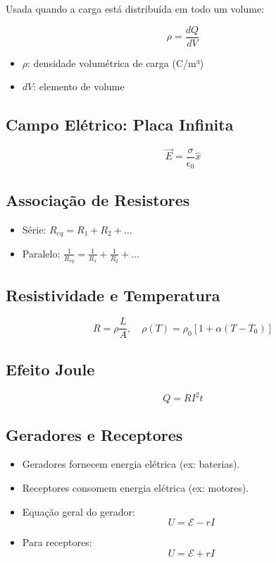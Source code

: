 \documentclass[a4paper,12pt]{article}
\begin{document}
\begin{multicols}{2}
Usada quando a carga está distribuída em todo um volume:

\[
\rho = \frac{dQ}{dV}
\]

\begin{itemize}
    \item $\rho$: densidade volumétrica de carga (C/m³)
    \item $dV$: elemento de volume
\end{itemize}

\subsection{Campo Elétrico: Placa Infinita}

\begin{equation*}
    \vec{E} = \frac{\sigma}{\epsilon_{0}}\hat{x}
\end{equation*}

\subsection{Associação de Resistores}
\begin{itemize}
    \item Série: $R_{eq} = R_1 + R_2 + \dots$
    \item Paralelo: $\frac{1}{R_{eq}} = \frac{1}{R_1} + \frac{1}{R_2} + \dots$
\end{itemize}

\subsection{Resistividade e Temperatura}
\[
    R = \rho \frac{L}{A}, \quad \rho(T) = \rho_0[1 + \alpha(T - T_0)]
\]

\subsection{Efeito Joule}
\[
    Q = R I^2 t
\]

\subsection{Geradores e Receptores}
\begin{itemize}
    \item Geradores fornecem energia elétrica (ex: baterias).
    \item Receptores consomem energia elétrica (ex: motores).
    \item Equação geral do gerador:
    \[
        U = \mathcal{E} - r I
    \]
    \item Para receptores:
    \[
        U = \mathcal{E} + r I
    \]
\end{itemize}


\end{multicols}
\end{document}
